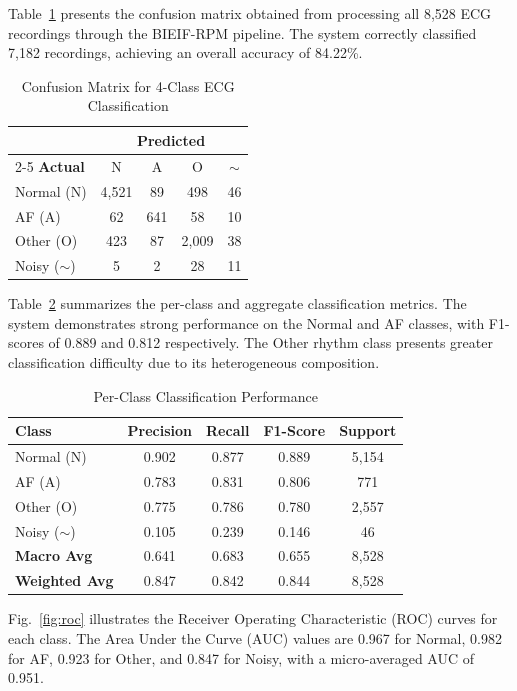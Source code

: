 Table~\ref{tab:confusion} presents the confusion matrix obtained from processing all 8,528 ECG recordings through the BIEIF-RPM pipeline. The system correctly classified 7,182 recordings, achieving an overall accuracy of 84.22\%.

\begin{table}[htbp]
\centering
\caption{Confusion Matrix for 4-Class ECG Classification}
\label{tab:confusion}
\begin{tabular}{@{}lcccc@{}}
\toprule
& \multicolumn{4}{c}{\textbf{Predicted}} \\
\cmidrule(l){2-5}
\textbf{Actual} & N & A & O & $\sim$ \\
\midrule
Normal (N) & 4,521 & 89 & 498 & 46 \\
AF (A) & 62 & 641 & 58 & 10 \\
Other (O) & 423 & 87 & 2,009 & 38 \\
Noisy ($\sim$) & 5 & 2 & 28 & 11 \\
\bottomrule
\end{tabular}
\end{table}

Table~\ref{tab:metrics} summarizes the per-class and aggregate classification metrics. The system demonstrates strong performance on the Normal and AF classes, with F1-scores of 0.889 and 0.812 respectively. The Other rhythm class presents greater classification difficulty due to its heterogeneous composition.

\begin{table}[htbp]
\centering
\caption{Per-Class Classification Performance}
\label{tab:metrics}
\begin{tabular}{@{}lcccc@{}}
\toprule
\textbf{Class} & \textbf{Precision} & \textbf{Recall} & \textbf{F1-Score} & \textbf{Support} \\
\midrule
Normal (N) & 0.902 & 0.877 & 0.889 & 5,154 \\
AF (A) & 0.783 & 0.831 & 0.806 & 771 \\
Other (O) & 0.775 & 0.786 & 0.780 & 2,557 \\
Noisy ($\sim$) & 0.105 & 0.239 & 0.146 & 46 \\
\midrule
\textbf{Macro Avg} & 0.641 & 0.683 & 0.655 & 8,528 \\
\textbf{Weighted Avg} & 0.847 & 0.842 & 0.844 & 8,528 \\
\bottomrule
\end{tabular}
\end{table}

Fig.~\ref{fig:roc} illustrates the Receiver Operating Characteristic (ROC) curves for each class. The Area Under the Curve (AUC) values are 0.967 for Normal, 0.982 for AF, 0.923 for Other, and 0.847 for Noisy, with a micro-averaged AUC of 0.951.

